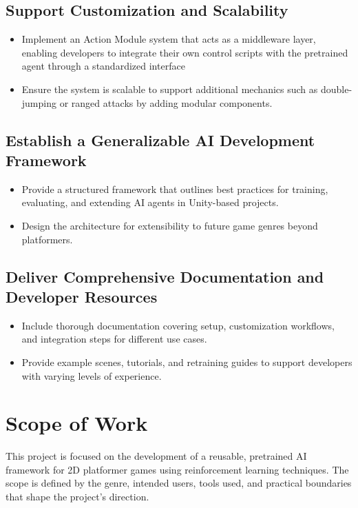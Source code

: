 \documentclass[12pt,oneside,openright,a4paper]{cpe-english-project}
\begin{document}
\subsection{Support Customization and Scalability}
\begin{itemize}
\item Implement an Action Module system that acts as a middleware layer, enabling developers to integrate their own control scripts with the pretrained agent through a standardized interface
\item Ensure the system is scalable to support additional mechanics such as double-jumping or ranged attacks by adding modular components.
\end{itemize}
\subsection{Establish a Generalizable AI Development Framework}
\begin{itemize}
\item Provide a structured framework that outlines best practices for training, evaluating, and extending AI agents in Unity-based projects.
\item Design the architecture for extensibility to future game genres beyond platformers.
\end{itemize}
\subsection{Deliver Comprehensive Documentation and Developer Resources}
\begin{itemize}
\item Include thorough documentation covering setup, customization workflows, and integration steps for different use cases.
\item Provide example scenes, tutorials, and retraining guides to support developers with varying levels of experience.
\end{itemize}

\section{Scope of Work}
This project is focused on the development of a reusable, pretrained AI framework for 2D platformer games using reinforcement learning techniques. The scope is defined by the genre, intended users, tools used, and practical boundaries that shape the project's direction.\par
\end{document}
